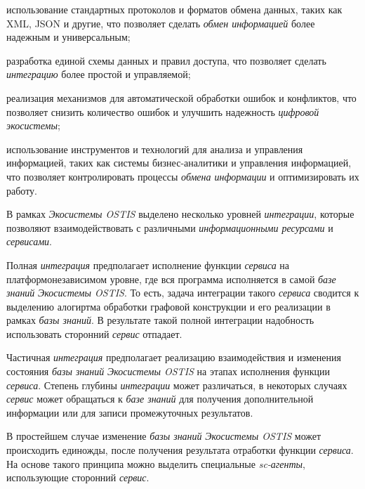 \begin{textitemize}
\item использование стандартных протоколов и форматов обмена данных, таких как XML, JSON и другие, что позволяет сделать \textit{обмен информацией} более надежным и универсальным;
\item разработка единой схемы данных и правил доступа, что позволяет сделать \textit{интеграцию} более простой и управляемой;
\item реализация механизмов для автоматической обработки ошибок и конфликтов, что позволяет снизить количество ошибок и улучшить надежность \textit{цифровой экосистемы};
\item использование инструментов и технологий для анализа и управления информацией, таких как системы бизнес-аналитики и управления информацией, что позволяет контролировать процессы \textit{обмена информации} и оптимизировать их работу.
\end{textitemize}


В рамках \textit{Экосистемы OSTIS} выделено несколько уровней \textit{интеграции}, которые позволяют взаимодействовать с различными \textit{информационными ресурсами} и \textit{сервисами}. 

Полная \textit{интеграция} предполагает исполнение функции \textit{сервиса} на платформонезависимом уровне, где вся программа исполняется в самой \textit{базе знаний} \textit{Экосистемы OSTIS}. То есть, задача интеграции такого \textit{сервиса} сводится к выделению алогиртма обработки графовой конструкции и его реализации в рамках \textit{базы знаний}. В результате такой полной интеграции надобность использовать сторонний \textit{сервис} отпадает. 

Частичная \textit{интеграция} предполагает реализацию взаимодействия и изменения состояния \textit{базы знаний} \textit{Экосистемы OSTIS} на этапах исполнения функции \textit{сервиса}. Степень глубины \textit{интеграции} может различаться, в некоторых случаях \textit{сервис} может обращаться к \textit{базе знаний} для получения дополнительной информации или для записи промежуточных результатов. 

В простейшем случае изменение \textit{базы знаний} \textit{Экосистемы OSTIS} может происходить единожды, после получения результата отработки функции \textit{сервиса}. На основе такого принципа можно выделить специальные \textit{sc-агенты}, использующие сторонний \textit{сервис}. 

